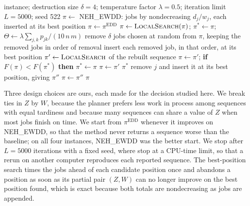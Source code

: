 \begin{algorithm}[ht]
\caption{Iterated greedy for weighted tardiness, after \citet{ruiz2008igwt}. The pair $F = (Z, W)$ is compared lexicographically, and every insertion is made at the best position.}
\label{alg:ig}
\small
\begin{algorithmic}[1]
\Require instance; destruction size $\delta = 4$; temperature factor $\lambda = 0.5$; iteration limit $L = 5000$; seed 522
\State $\pi \gets$ NEH\_EWDD: jobs by nondecreasing $d_j / w_j$, each inserted at its best position
 $\pi \gets \pi^{\mathrm{EDD}}$ \EndIf
\State $\pi \gets \textsc{LocalSearch}(\pi)$; \quad $\pi^{*} \gets \pi$; \quad $\Theta \gets \lambda \sum_{j,k} p_{jk} / (10\, n\, m)$
  \State remove $\delta$ jobs chosen at random from $\pi$, keeping the removed jobs in order of removal
  \State insert each removed job, in that order, at its best position
  \State $\pi' \gets \textsc{LocalSearch}$ of the rebuilt sequence
   $\pi \gets \pi'$; \textbf{if} $F(\pi) < F(\pi^{*})$ \textbf{then} $\pi^{*} \gets \pi$
   $\pi \gets \pi'$
  \EndIf
\EndFor
\State \Return $\pi^{*}$
\Statex
{}
  \Repeat
      \State remove $j$ and insert it at its best position, giving $\pi''$
       $\pi \gets \pi''$ \EndIf
    \EndFor
  \State \Return $\pi$
\EndFunction
\end{algorithmic}
\end{algorithm}

\sumpara Three design choices are ours, each made for the decision studied here. \sumparaend
\fin We break ties in $Z$ by $W$, because the planner prefers less work in process among sequences with equal tardiness and because many sequences can share a value of $Z$ when most jobs finish on time. \fine
\fin We start from $\pi^{\mathrm{EDD}}$ whenever it improves on NEH\_EWDD, so that the method never returns a sequence worse than the baseline; on all four instances, NEH\_EWDD was the better start. \fine
\fin We stop after $L = 5000$ iterations with a fixed seed, where \citet{ruiz2008igwt} stop at a CPU-time limit, so that a rerun on another computer reproduces each reported sequence. \fine
\fin The best-position search times the jobs ahead of each candidate position once and abandons a position as soon as its partial pair $(Z, W)$ can no longer improve on the best position found, which is exact because both totals are nondecreasing as jobs are appended. \fine
